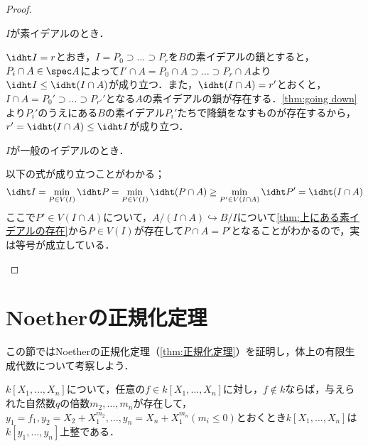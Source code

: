 \begin{proof}
	\begin{step}
		\item $I$が素イデアルのとき．
		
		$\idht I=r$とおき，$I=P_0\supset\dots\supset P_r$を$B$の素イデアルの鎖とすると，$P_i\cap A\in\spec A$によって$I'\cap A=P_0\cap A\supset\dots\supset P_r\cap A$より$\idht I\leq \idht (I\cap A)$が成り立つ．また，$\idht (I\cap A)=r'$とおくと，$I\cap A=P_0'\supset\dots\supset P_{r'}'$となる$A$の素イデアルの鎖が存在する．\ref{thm:going down}より$P_i'$のうえにある$B$の素イデアル$P_i'$たちで降鎖をなすものが存在するから，$r'=\idht(I\cap A)\leq\idht I$が成り立つ．
		
		\item $I$が一般のイデアルのとき．
		
		以下の式が成り立つことがわかる；
		\[\idht I=\min_{P\in V(I)}\idht P=\min_{P\in V(I)}\idht (P\cap A)\geq\min_{P'\in V(I\cap A)}\idht P'=\idht (I\cap A)\]
		ここで$P'\in V(I\cap A)$について，$A/(I\cap A)\hookrightarrow B/I$について\ref{thm:上にある素イデアルの存在}から$P\in V(I)$が存在して$P\cap A=P'$となることがわかるので，実は等号が成立している．
	\end{step}
\end{proof}

\section{Noetherの正規化定理}
この節ではNoetherの正規化定理（\ref{thm:正規化定理}）を証明し，体上の有限生成代数について考察しよう．
%
%
%

\begin{lem}\label{lem:正規化の補題1}
	$k[X_1,\dots,X_n]$について，任意の$f\in k[X_1,\dots,X_n]$に対し，$f\not\in k$ならば，与えられた自然数$q$の倍数$m_2,\dots,m_n$が存在して，$y_1=f_1,y_2=X_2+X_1^{m_2},\dots,y_n=X_n+X_1^{m_n} (m_i\leq0)$とおくとき$k[X_1,\dots,X_n]$は$k[y_1,\dots,y_n]$上整である．
\end{lem}

